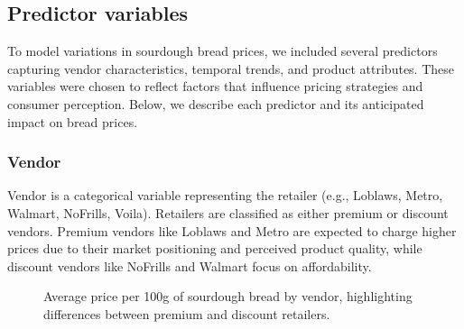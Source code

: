 \documentclass[
  letterpaper,
  DIV=11,
  numbers=noendperiod]{scrartcl}
\begin{document}
\subsection{Predictor variables}\label{predictor-variables}

To model variations in sourdough bread prices, we included several
predictors capturing vendor characteristics, temporal trends, and
product attributes. These variables were chosen to reflect factors that
influence pricing strategies and consumer perception. Below, we describe
each predictor and its anticipated impact on bread prices.

\subsubsection{Vendor}\label{vendor}

Vendor is a categorical variable representing the retailer (e.g.,
Loblaws, Metro, Walmart, NoFrills, Voila). Retailers are classified as
either premium or discount vendors. Premium vendors like Loblaws and
Metro are expected to charge higher prices due to their market
positioning and perceived product quality, while discount vendors like
NoFrills and Walmart focus on affordability.

\begin{figure}


\caption{\label{fig-vendor-prices}Average price per 100g of sourdough
bread by vendor, highlighting differences between premium and discount
retailers.}

\end{figure}%
\end{document}
